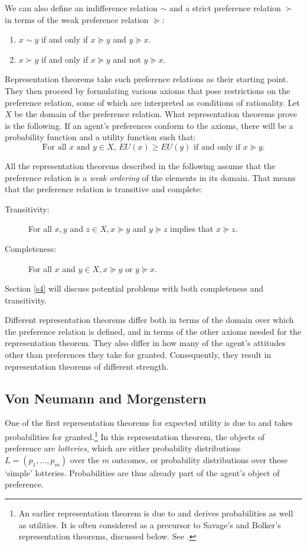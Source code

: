 We can also define an indifference relation $\sim$ and a strict preference relation $\succ$ in terms of the weak preference relation $\succcurlyeq$:
\begin{enumerate}
\item $x \sim y$ if and only if $x \succcurlyeq y$ and $y \succcurlyeq x$.
\item $x \succ y$ if and only if $x \succcurlyeq y$ and not $y \succcurlyeq x$.
\end{enumerate}
Representation theorems take such preference relations as their starting point. They then proceed by formulating various axioms that pose restrictions on the preference relation, some of which are interpreted as conditions of rationality. Let $X$ be the domain of the preference relation. What representation theorems prove is the following. If an agent's preferences conform to the axioms, there will be a probability function and a utility function such that:
$$\textrm{For all $x$ and $y \in X$, } EU(x) \geq EU(y) \textrm{ if and only if } x \succcurlyeq y.$$

All the representation theorems described in the following assume that the preference relation is a {\em weak ordering} of the elements in its domain. That means that the preference relation is transitive and complete:
\begin{description}
\item[Transitivity:] For all $x, y$ and $z \in X, x \succcurlyeq y$ and $y \succcurlyeq z$ implies that $x \succcurlyeq z$.
\item[Completeness:] For all $x$ and $y \in X, x \succcurlyeq y$ or $y \succcurlyeq x$.
\end{description}
Section \ref{s4} will discuss potential problems with both completeness and transitivity.

Different representation theorems differ both in terms of the domain over which the preference relation is defined, and in terms of the other axioms needed for the representation theorem. They also differ in how many of the agent's attitudes other than preferences they take for granted. Consequently, they result in representation theorems of different strength.

\subsection{Von Neumann and Morgenstern}\label{subs22}

One of the first representation theorems for expected utility is due to \citet{vNM1944} and takes probabilities for granted.\footnote{An earlier representation theorem is due to \citet{Ramsey1926} and derives probabilities as well as utilities. It is often considered as a precursor to Savage's and Bolker's representation theorems, discussed below. See \citet{Bradley2004}.} In this representation theorem, the objects of preference are {\em lotteries}, which are either probability distributions $L = (p_1, ..., p_m)$ over the $m$ outcomes, or probability distributions over these `simple' lotteries. Probabilities are thus already part of the agent's object of preference.

